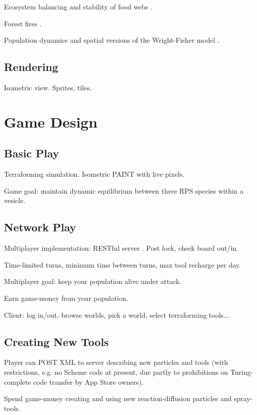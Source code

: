 \documentclass{acm_proc_article-sp}
\begin{document}
Ecosystem balancing and stability of food webs \cite{quince2005topological}.

Forest fires \cite{Karafyllidis1997}.

Population dynamics and spatial versions of the Wright-Fisher model \cite{MathiesonMcVean2013}.

\subsection{Rendering}

Isometric view.
Sprites, tiles.

\section{Game Design}

\subsection{Basic Play}

Terraforming simulation.
Isometric PAINT with live pixels.

Game goal: maintain dynamic equilibrium between three RPS species within a vesicle.

\subsection{Network Play}

Multiplayer implementation: RESTful server \cite{rest}.
Post lock, check board out/in.

Time-limited turns, minimum time between turns, max tool recharge per day.

Multiplayer goal: keep your population alive under attack.

Earn game-money from your population.

Client: log in/out, browse worlds, pick a world, select terraforming tools...

\subsection{Creating New Tools}

Player can POST XML to server describing new particles and tools
(with restrictions, e.g. no Scheme code at present, due partly to prohibitions on Turing-complete code transfer by App Store owners).

Spend game-money creating and using new reaction-diffusion particles and spray-tools.
\end{document}
